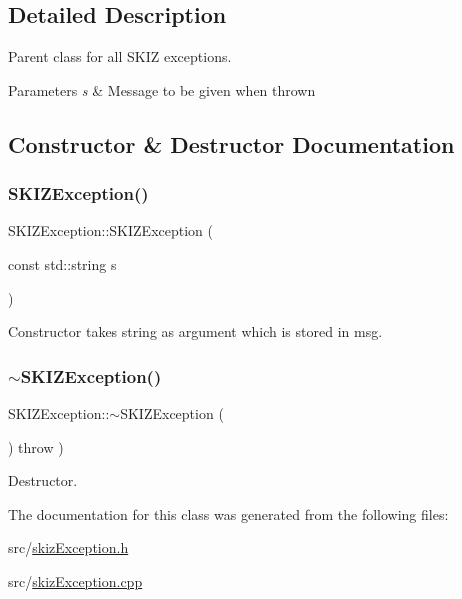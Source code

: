 \subsection{Detailed Description}
Parent class for all S\+K\+IZ exceptions. 


\begin{DoxyParams}{Parameters}
{\em s} & Message to be given when thrown \\
\hline
\end{DoxyParams}


\subsection{Constructor \& Destructor Documentation}
\mbox{\label{classSKIZException_a30a47c59e9fd4ea93441c9029c4068d9}} 
\subsubsection{\texorpdfstring{S\+K\+I\+Z\+Exception()}{SKIZException()}}
{\footnotesize\ttfamily S\+K\+I\+Z\+Exception\+::\+S\+K\+I\+Z\+Exception (\begin{DoxyParamCaption}\item[{const std\+::string}]{s }\end{DoxyParamCaption})}



Constructor takes string as argument which is stored in msg. 

\mbox{\label{classSKIZException_ac1b8f1ba8ae87ce018c645a1a67b6d34}} 
\subsubsection{\texorpdfstring{$\sim$\+S\+K\+I\+Z\+Exception()}{~SKIZException()}}
{\footnotesize\ttfamily S\+K\+I\+Z\+Exception\+::$\sim$\+S\+K\+I\+Z\+Exception (\begin{DoxyParamCaption}{ }\end{DoxyParamCaption}) throw  ) \hspace{0.3cm}{\ttfamily [virtual]}}



Destructor. 



The documentation for this class was generated from the following files\+:\begin{DoxyCompactItemize}
\item 
src/\mbox{\hyperlink{skizException_8h}{skiz\+Exception.\+h}}\item 
src/\mbox{\hyperlink{skizException_8cpp}{skiz\+Exception.\+cpp}}\end{DoxyCompactItemize}
